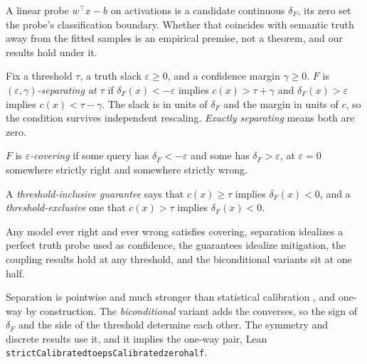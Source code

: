 \documentclass[mlmain,onecolumn]{jmlr}
\newcommand{\conf}{c}
\newcommand{\dF}{\delta_{\!F}}
\newcommand{\leanid}[1]{{\def\_{\textunderscore\allowbreak}\texttt{#1}}}
\begin{document}
A linear probe $w^\top x - b$ on activations
\citep{marks2024geometry,burns2023discovering} is a candidate
continuous $\dF$, its zero set the probe's classification boundary.
Whether that coincides with semantic truth away from the fitted
samples is an empirical premise, not a theorem, and our results
hold under it.

\begin{definition}
\label{def:separating}
Fix a threshold $\tau$, a truth slack $\varepsilon \ge 0$, and a
confidence margin $\gamma \ge 0$. $F$ is
\emph{$(\varepsilon, \gamma)$-separating at $\tau$} if
$\dF(x) < -\varepsilon$ implies $\conf(x) > \tau + \gamma$ and
$\dF(x) > \varepsilon$ implies $\conf(x) < \tau - \gamma$. The slack
is in units of $\dF$ and the margin in units of $\conf$, so the
condition survives independent rescaling. \emph{Exactly separating}
means both are zero.
\end{definition}

\begin{definition}[Covering]
\label{def:covering}
$F$ is \emph{$\varepsilon$-covering} if some query has
$\dF < -\varepsilon$ and some has $\dF > \varepsilon$, at
$\varepsilon = 0$ somewhere strictly right and somewhere strictly
wrong.
\end{definition}

\begin{definition}[Guarantees]
\label{def:guarantees}
A \emph{threshold-inclusive guarantee} says that
$\conf(x) \ge \tau$ implies $\dF(x) < 0$, and a
\emph{threshold-exclusive} one that $\conf(x) > \tau$ implies
$\dF(x) < 0$.
\end{definition}

Any model ever right and ever wrong satisfies covering,
separation idealizes a perfect truth probe used as confidence, the
guarantees idealize mitigation, the coupling results hold at any
threshold, and the biconditional variants sit at one half.

\begin{remark}
\label{rem:calibration}\sloppy
Separation is pointwise and much stronger than statistical
calibration \citep{guo2017calibration}, and one-way by construction.
The \emph{biconditional} variant adds the converses, so the sign of
$\dF$ and the side of the threshold determine each other. The
symmetry and discrete results use it, and it implies the one-way
pair, Lean
\leanid{strictCalibrated\_to\_epsCalibrated\_zero\_half}.
\end{remark}
\end{document}
